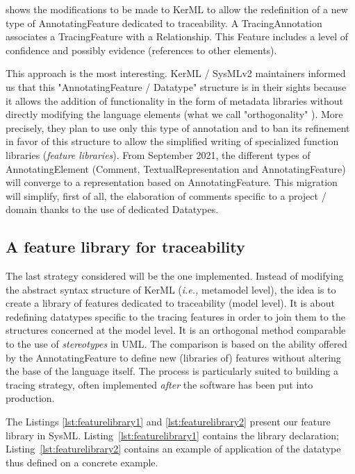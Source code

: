  shows the modifications to be made to {KerML} to allow the redefinition of a new type of AnnotatingFeature dedicated to traceability.
A TracingAnnotation associates a TracingFeature with a Relationship. This Feature includes a level of confidence and possibly evidence (references to other elements).



This approach is the most interesting. KerML / SysMLv2 maintainers informed us that this "AnnotatingFeature / Datatype" structure is in their sights because it allows the addition of functionality in the form of metadata libraries without directly modifying the language elements (what we call "orthogonality" ). More precisely, they plan to use only this type of annotation and to ban its refinement in favor of this structure to allow the simplified writing of specialized function libraries (\textit{feature libraries}).
From September 2021, the different types of AnnotatingElement (Comment, TextualRepresentation and AnnotatingFeature) will converge to a representation based on AnnotatingFeature. This migration will simplify, first of all, the elaboration of comments specific to a project / domain thanks to the use of dedicated Datatypes.

\subsection{A feature library for traceability }
The last strategy considered will be the one implemented. Instead of modifying the abstract syntax structure of {KerML} (\textit{i.e.,} metamodel level), the idea is to create a library of features dedicated to traceability (model level).
It is about redefining datatypes specific to the tracing features in order to join them to the structures concerned at the model level. It is an orthogonal method comparable to the use of \textit{stereotypes} in UML. The comparison is based on the ability offered by the AnnotatingFeature to define new (libraries of) features without altering the base of the language itself. The process is particularly suited to building a tracing strategy, often implemented \textit{after} the software has been put into production.

The Listings \ref{lst:featurelibrary1} and \ref{lst:featurelibrary2} present our feature library {in SysML}. Listing~\ref{lst:featurelibrary1} contains the library declaration; Listing~\ref{lst:featurelibrary2} contains an example of application of the datatype thus defined on a concrete example. 


% 

